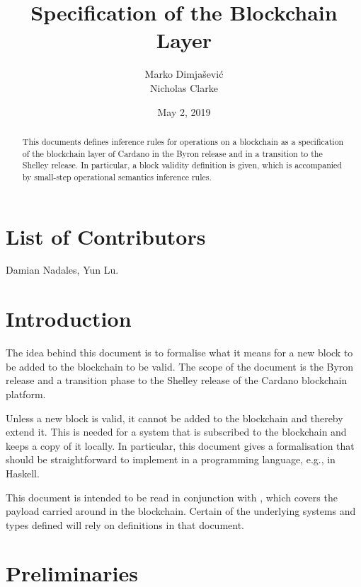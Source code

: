 \documentclass[11pt,a4paper]{article}
\begin{document}
\title{Specification of the Blockchain Layer}

\author{Marko Dimjašević \\ Nicholas Clarke}

\date{May 2, 2019}

\maketitle

\begin{abstract}
  This documents defines inference rules for operations on a blockchain as a
  specification of the blockchain layer of Cardano in the Byron release and in
  a transition to the Shelley release.
  In particular, a block validity definition is given, which is accompanied by
  small-step operational semantics inference rules.
\end{abstract}

\section*{List of Contributors}
\label{acknowledgements}

Damian Nadales, Yun Lu.

\tableofcontents
\listoffigures

\section{Introduction}
\label{sec:introduction}

The idea behind this document is to formalise what it means for a new block to
be added to the blockchain to be valid.
%
The scope of the document is the Byron release and a transition phase to the
Shelley release of the Cardano blockchain platform.


Unless a new block is valid, it cannot be added to the blockchain and thereby
extend it.
%
This is needed for a system that is subscribed to the blockchain and keeps a
copy of it locally.
%
In particular, this document gives a formalisation that should be
straightforward to implement in a programming language, e.g., in Haskell.

This document is intended to be read in conjunction with \cite{byron_ledger_spec},
which covers the payload carried around in the blockchain. Certain of the
underlying systems and types defined will rely on definitions in that document.

\section{Preliminaries}
\label{sec:preliminaries}
\end{document}
